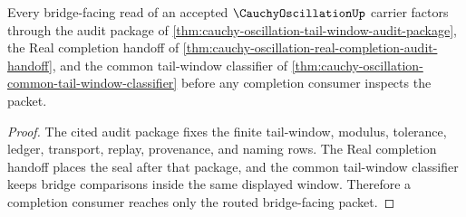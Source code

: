 

\begin{theorem}
\label{thm:cauchyoscillation-bridge-route}
Every bridge-facing read of an accepted $\CauchyOscillationUp$ carrier factors through the audit package of \autoref{thm:cauchy-oscillation-tail-window-audit-package}, the Real completion handoff of \autoref{thm:cauchy-oscillation-real-completion-audit-handoff}, and the common tail-window classifier of \autoref{thm:cauchy-oscillation-common-tail-window-classifier} before any completion consumer inspects the packet.
\end{theorem}
\begin{proof}
The cited audit package fixes the finite tail-window, modulus, tolerance, ledger, transport, replay, provenance, and naming rows. The Real completion handoff places the seal after that package, and the common tail-window classifier keeps bridge comparisons inside the same displayed window. Therefore a completion consumer reaches only the routed bridge-facing packet.
\end{proof}


